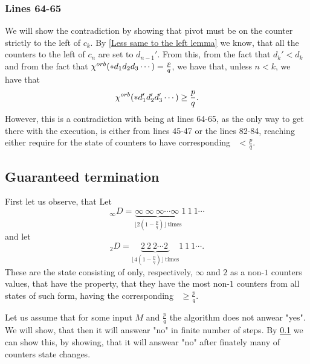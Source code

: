 \subsubsection{Lines 64-65}
We will show the contradiction by showing that pivot must be on 
the counter strictly to the left of $c_k$. 
By \ref{Less same to the left lemma} 
we know, that all the counters to the left of $c_n$ are set to $d_{n-1}'$. 
From this, from the fact that $d_k' < d_k$ and 
from the fact that ${\chi^{orb}(*d_1d_2d_3\cdots)} = \frac{p}{q}$, 
we have that, unless $n < k$, we have that 
\begin{equation}
{\chi^{orb}(*d_1'd_2'd_3'\cdots)} \geq \frac{p}{q}.
\end{equation}
However, this is a contradiction with being at lines 64-65, as 
the only way to get there with the execution, is either from lines 
45-47 or the lines 82-84, reaching either require for the state of counters to have 
corresponding \Eoc\ $<\frac{p}{q}$.


\subsection{Guaranteed termination}
First let us observe, that 
Let 
\begin{equation}
_\infty D = \underbrace{\infty\ \infty\ \infty\cdots 
\infty\ }_{\lfloor 2(1-\frac{p}{q})\rfloor\ \mathrm{times}}1\ 1\ 1\cdots
\end{equation}
and let 
\begin{equation}
_2D = \underbrace{2\ 2\ 2\cdots 
2\ }_{\lfloor 4(1-\frac{p}{q})\rfloor\ \mathrm{times}}1\ 1\ 1\cdots.
\end{equation}
These are the state consisting of only, respectively, $\infty$ and $2$ as a non-$1$ counters 
values, that have the property, that they have the most non-$1$ counters from all 
states of such form, having the corresponding \Eoc\ $\geq\frac{p}{q}$. 

Let us assume that for some input $M$ and $\frac{p}{q}$ the algorithm does not anwear "yes". 
We will show, that then it will answear "no" in finite number of steps. By \ref{} 
we can show this, by showing, that it will answear "no" after 
finately many of counters state changes. 

